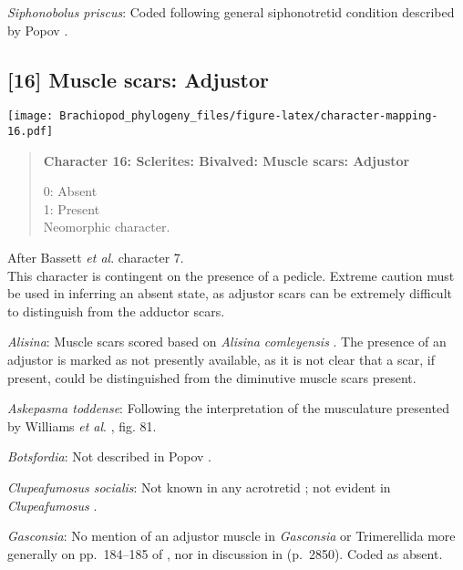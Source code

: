 \documentclass[openany]{book}
\theoremstyle{definition}
\theoremstyle{definition}
\theoremstyle{definition}
\theoremstyle{remark}
\begin{document}
\hypertarget{Siphonobolus_priscus-coding-15}{}
\emph{Siphonobolus priscus}: Coded following general siphonotretid
condition described by Popov \citeyearpar[p.~407]{Popov1992TheCambrian}.

\subsection*{{[}16{]} Muscle scars:
Adjustor}\label{muscle-scars-adjustor}

\texttt{[image: Brachiopod\_phylogeny\_files/figure-latex/character-mapping-16.pdf]}

\begin{quote}
\textbf{Character 16: Sclerites: Bivalved: Muscle scars: Adjustor}

0: Absent\\
1: Present\\
Neomorphic character.
\end{quote}

After Bassett \emph{et al}.
\citeyearpar{Bassett2001Functionalmorphology} character 7.\\
This character is contingent on the presence of a pedicle. Extreme
caution must be used in inferring an absent state, as adjustor scars can
be extremely difficult to distinguish from the adductor scars.

\hypertarget{Alisina-coding-16}{}
\emph{Alisina}: Muscle scars scored based on \emph{Alisina}
\emph{comleyensis} \citep{Bassett2001Functionalmorphology}. The presence
of an adjustor is marked as not presently available, as it is not clear
that a scar, if present, could be distinguished from the diminutive
muscle scars present.

\hypertarget{Askepasma_toddense-coding-16}{}
\emph{Askepasma toddense}: Following the interpretation of the
musculature presented by Williams \emph{et al}.
\citeyearpar{Williams2000LinguliformeaCraniiformea}, fig. 81.

\hypertarget{Botsfordia-coding-16}{}
\emph{Botsfordia}: Not described in Popov
\citeyearpar{Popov1992TheCambrian}.

\hypertarget{Clupeafumosus_socialis-coding-16}{}
\emph{Clupeafumosus socialis}: Not known in any acrotretid
\citep{Williams2000LinguliformeaCraniiformea}; not evident in
\emph{Clupeafumosus} \citep{Topper2013Reappraisalof}.

\hypertarget{Gasconsia-coding-16}{}
\emph{Gasconsia}: No mention of an adjustor muscle in \emph{Gasconsia}
or Trimerellida more generally on pp.~184--185 of
\citet{Williams2000LinguliformeaCraniiformea}, nor in discussion in
\citet{Williams2007Supplement} (p.~2850). Coded as absent.
\end{document}
